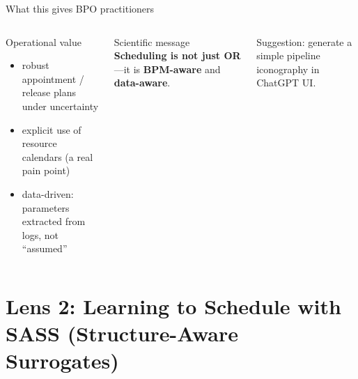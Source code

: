 \documentclass[aspectratio=169,10pt]{beamer}
\newcommand{\btext}[1]{\textbf{\color{darkred}#1}}
\begin{document}
\begin{frame}{What this gives BPO practitioners}
  \begin{columns}[T]
      \begin{block}{Operational value}
        \begin{itemize}
          \item robust appointment / release plans under uncertainty
          \item explicit use of resource calendars (a real pain point)
          \item data-driven: parameters extracted from logs, not ``assumed''
        \end{itemize}
      \end{block}

      \begin{block}{Scientific message}
        \btext{Scheduling is not just OR}---it is \btext{BPM-aware} and \btext{data-aware}.
      \end{block}

      \centering
      \vspace{0.1cm}
      \scriptsize
      Suggestion: generate a simple pipeline iconography in ChatGPT UI.
  \end{columns}
\end{frame}


\section{Lens 2: Learning to Schedule with SASS (Structure-Aware Surrogates)}
\end{document}
